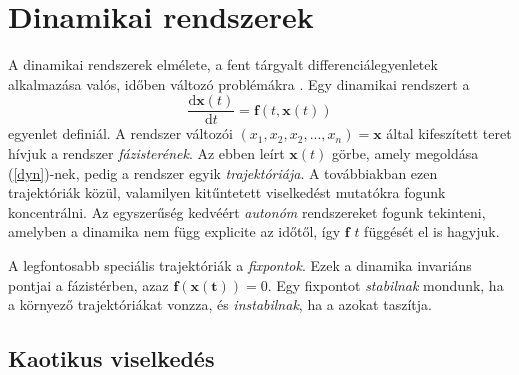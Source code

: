 \documentclass[12pt]{article}
\theoremstyle{plain}
\newcommand{\xvec}{\mathbf{x}}
\begin{document}
\section{Dinamikai rendszerek}
A dinamikai rendszerek elmélete, a fent tárgyalt differenciálegyenletek alkalmazása valós, időben változó problémákra \cite{tel, compl}. Egy dinamikai rendszert a 
\begin{equation}
    \label{dyn}
    \frac{\text{d} \xvec(t)}{\text{d}t} = \mathbf{f}(t, \xvec(t)) 
\end{equation}
egyenlet definiál. A rendszer változói $(x_1, x_2, x_2, ..., x_n) = \xvec$ által kifeszített teret hívjuk a rendszer {\em fázisterének}. Az ebben leírt $\xvec(t)$ görbe, amely megoldása (\ref{dyn})-nek, pedig a rendszer egyik {\em trajektóriája}. A továbbiakban ezen trajektóriák közül, valamilyen kitűntetett viselkedést mutatókra fogunk koncentrálni. Az egyszerűség kedvéért {\em autonóm} rendszereket fogunk tekinteni, amelyben a dinamika nem függ explicite az időtől, így $\mathbf{f}$ $t$ függését el is hagyjuk. 

A legfontosabb speciális trajektóriák a {\em fixpontok}. Ezek a dinamika invariáns pontjai a fázistérben, azaz $\mathbf{f(\xvec(t))} = 0$. Egy fixpontot {\em stabilnak} mondunk, ha a környező trajektóriákat vonzza, és {\em instabilnak}, ha a azokat taszítja. 
\subsection{Kaotikus viselkedés}



\end{document}
